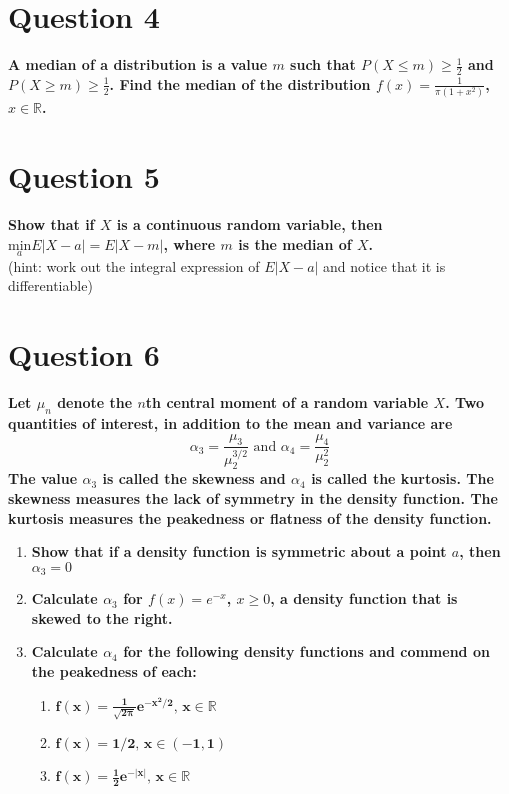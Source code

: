 \documentclass{article}
\newcommand{\R}{\mathbb{R}}
\begin{document}
\section*{Question 4}
\textbf{A median of a distribution is a value $m$ such that $P(X\leq m)\geq\frac{1}{2}$ and $P(X\geq m)\geq\frac{1}{2}$. Find the median of the distribution $f(x)=\frac{1}{\pi(1+x^2)}$, $x\in\R$.}
\bigskip \\




\section*{Question 5}
\textbf{Show that if $X$ is a continuous random variable, then $\underset{a}{\text{min}}E|X-a|=E|X-m|$, where $m$ is the median of $X$.}
\bigskip \\
(hint: work out the integral expression of $E|X-a|$ and notice that it is differentiable)



\section*{Question 6}
\textbf{Let $\mu_n$ denote the $n$th central moment of a random variable $X$. Two quantities of interest, in addition to the mean and variance are}
\[
	\alpha_3 = \dfrac{\mu_3}{\mu_2^{3/2}}\text{ and }\alpha_4=\dfrac{\mu_4}{\mu_2^2}
\]
\textbf{The value $\alpha_3$ is called the skewness and $\alpha_4$ is called the kurtosis. The skewness measures the lack of symmetry in the density function. The kurtosis measures the peakedness or flatness of the density function.}
\begin{enumerate}
	\item \textbf{Show that if a density function is symmetric about a point $a$, then $\alpha_3=0$}
		\bigskip \\
		
		
	\item \textbf{Calculate $\alpha_3$ for $f(x)=e^{-x}$, $x\geq0$, a density function that is skewed to the right.}
		\bigskip \\
	
	
	\item \textbf{Calculate $\alpha_4$ for the following density functions and commend on the peakedness of each:}
		\begin{enumerate}
			\item $\mathbf{f(x)=\frac{1}{\sqrt{2\pi}}e^{-x^2/2}\text{, }x\in\R}$
				\bigskip \\
			
			\item $\mathbf{f(x)=1/2\text{, }x\in(-1,1)}$
				\bigskip \\
			\item $\mathbf{f(x)=\frac{1}{2}e^{-|x|}\text{, }x\in\R}$
				\bigskip \\
		\end{enumerate}
		
		
\end{enumerate}

\end{document}
